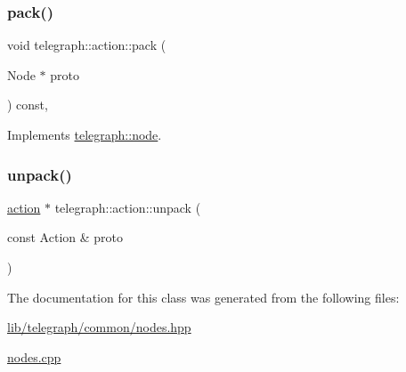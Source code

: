 \mbox{\label{classtelegraph_1_1action_a849370efc692c6c4e7047e3b9c50983c}} 
\subsubsection{\texorpdfstring{pack()}{pack()}\hspace{0.1cm}{\footnotesize\ttfamily [2/2]}}
{\footnotesize\ttfamily void telegraph\+::action\+::pack (\begin{DoxyParamCaption}\item[{Node $\ast$}]{proto }\end{DoxyParamCaption}) const\hspace{0.3cm}{\ttfamily [override]}, {\ttfamily [virtual]}}



Implements \hyperlink{classtelegraph_1_1node_a5006b21e9b83ecd52f3f953a1b828773}{telegraph\+::node}.

\mbox{\label{classtelegraph_1_1action_a3eeafc85f20bfe616d7d9ea903d24267}} 
\subsubsection{\texorpdfstring{unpack()}{unpack()}}
{\footnotesize\ttfamily \hyperlink{classtelegraph_1_1action}{action} $\ast$ telegraph\+::action\+::unpack (\begin{DoxyParamCaption}\item[{const Action \&}]{proto }\end{DoxyParamCaption})\hspace{0.3cm}{\ttfamily [static]}}



The documentation for this class was generated from the following files\+:\begin{DoxyCompactItemize}
\item 
\hyperlink{lib_2telegraph_2common_2nodes_8hpp}{lib/telegraph/common/nodes.\+hpp}\item 
\hyperlink{nodes_8cpp}{nodes.\+cpp}\end{DoxyCompactItemize}
